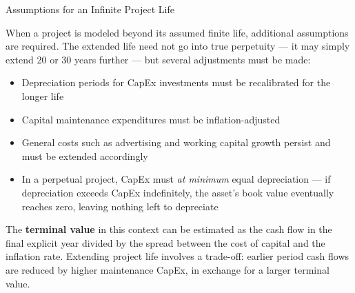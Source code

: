 \documentclass[10pt]{article}
\begin{document}
    \begin{core}{Assumptions for an Infinite Project Life}

      When a project is modeled beyond its assumed finite life, additional assumptions are required. The extended life need not go into true perpetuity — it may simply extend 20 or 30 years further — but several adjustments must be made:

      \begin{itemize}

        \item Depreciation periods for CapEx investments must be recalibrated for the longer life

        \item Capital maintenance expenditures must be inflation-adjusted

        \item General costs such as advertising and working capital growth persist and must be extended accordingly

        \item In a perpetual project, CapEx must \textit{at minimum} equal depreciation — if depreciation exceeds CapEx indefinitely, the asset's book value eventually reaches zero, leaving nothing left to depreciate

      \end{itemize}

      The \textbf{terminal value} in this context can be estimated as the cash flow in the final explicit year divided by the spread between the cost of capital and the inflation rate. Extending project life involves a trade-off: earlier period cash flows are reduced by higher maintenance CapEx, in exchange for a larger terminal value.


    \end{core}
\end{document}
